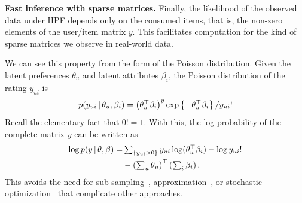 {\bf Fast inference with sparse matrices.}  Finally, the likelihood of
the observed data under HPF depends only on the consumed
items, that is, the non-zero elements of the user/item matrix $y$.
This facilitates computation for the kind of sparse matrices we
observe in real-world data.

We can see this property from the form of the Poisson distribution.
Given the latent preferences $\theta_u$ and latent attributes
$\beta_i$, the Poisson distribution of the rating $y_{ui}$ is
\begin{equation}
  p(y_{ui} \,\vert\, \theta_u, \beta_i) =
  \left(\theta_u^\top \beta_i\right)^y
  \exp\left\{-\theta_u^\top \beta_i \right\} / y_{ui}!
\end{equation}
Recall the elementary fact that $0! = 1$.  With this, the log
probability of the complete matrix $y$ can be written as
\begin{align*}
  \log p(y \,\vert\, \theta, \beta) =
  & \textstyle \sum_{\{y_{ui} > 0\}}
    y_{ui} \log (\theta_u^\top \beta_i) - \log y_{ui}!
   \\
  & -
  \left(\textstyle\sum_{u} \theta_u\right)^\top \left(\textstyle
    \sum_{i} \beta_i\right). \nonumber
\end{align*}
This avoids the need for sub-sampling~\cite{Dror:2012a},
approximation~\cite{Hu:2008p9402}, or stochastic
optimization~\cite{Mairal:2010} that complicate other approaches.
